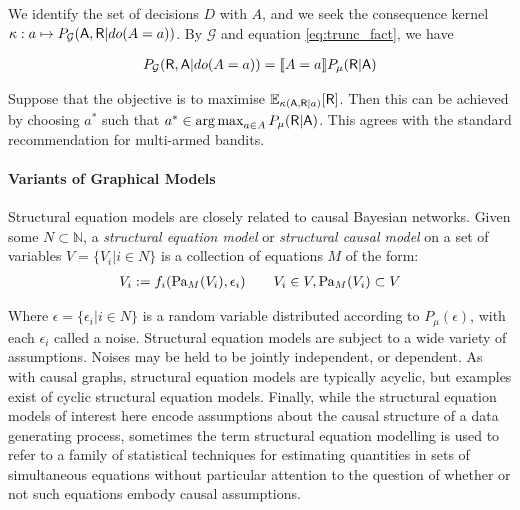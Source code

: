 We identify the set of decisions $D$ with $A$, and we seek the consequence kernel $\kappa:a\mapsto P_{\mathcal{G}}(\mathsf{A},\mathsf{R}|do(A=a))$. By $\mathcal{G}$ and equation \ref{eq:trunc_fact}, we have

\begin{align}
    P_{\mathcal{G}}(\mathsf{R},\mathsf{A}|do(A=a)) = \llbracket A=a\rrbracket P_\mu(\mathsf{R}|\mathsf{A})
\end{align}

Suppose that the objective is to maximise $\mathbb{E}_{\kappa(\mathsf{A},\mathsf{R}|a)}[\mathsf{R}]$. Then this can be achieved by choosing $a^*$ such that $a^*\in \operatorname*{arg\,max}_{a\in A} P_\mu(\mathsf{R}|\mathsf{A})$. This agrees with the standard recommendation for multi-armed bandits\cite{barto_reinforcement_1998}.

\paragraph{Variants of Graphical Models}

Structural equation models are closely related to causal Bayesian networks. Given some $N\subset \mathbb{N}$, a \emph{structural equation model} or \emph{structural causal model} on a set of variables $V=\{V_i|i\in N\}$ is a collection of equations $M$ of the form:
\begin{align}
    V_i:= f_i(\text{Pa}_{M}(V_i),\epsilon_i)\qquad V_i\in V, \text{Pa}_{M}(V_i)\subset V
\end{align}

Where $\epsilon = \{\epsilon_i|i\in N\}$ is a random variable distributed according to $P_\mu(\epsilon)$, with each $\epsilon_i$ called a noise. Structural equation models are subject to a wide variety of assumptions. Noises may be held to be jointly independent\cite{pearl_causality:_2009,wright1921correlation,haavelmo1943statistical}, or dependent\cite{rubenstein_causal_2017,heckman_structural_2005}. As with causal graphs, structural equation models are typically acyclic, but examples exist of cyclic structural equation models\cite{bongers_theoretical_2016,itani2010structure}. Finally, while the structural equation models of interest here encode assumptions about the causal structure of a data generating process, sometimes the term structural equation modelling is used to refer to a family of statistical techniques for estimating quantities in sets of simultaneous equations without particular attention to the question of whether or not such equations embody causal assumptions\cite{chin_commentary:_1998}.

